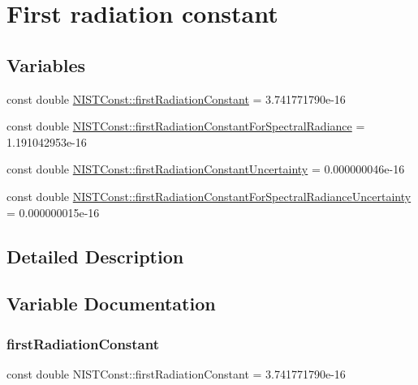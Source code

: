 \hypertarget{group___n_i_s_t_const-_first_radiation_constant}{}\section{First radiation constant}
\label{group___n_i_s_t_const-_first_radiation_constant}
\subsection*{Variables}
\begin{DoxyCompactItemize}
\item 
const double \hyperlink{group___n_i_s_t_const-_first_radiation_constant_ga59a54a84c539969a14695bd822b116cb}{N\+I\+S\+T\+Const\+::first\+Radiation\+Constant} = 3.\+741771790e-\/16
\item 
const double \hyperlink{group___n_i_s_t_const-_first_radiation_constant_ga877c0bc2579b88ae515b80aeb58aa68e}{N\+I\+S\+T\+Const\+::first\+Radiation\+Constant\+For\+Spectral\+Radiance} = 1.\+191042953e-\/16
\item 
const double \hyperlink{group___n_i_s_t_const-_first_radiation_constant_ga1b1ea4335364c4f0b19810842fd6c741}{N\+I\+S\+T\+Const\+::first\+Radiation\+Constant\+Uncertainty} = 0.\+000000046e-\/16
\item 
const double \hyperlink{group___n_i_s_t_const-_first_radiation_constant_gaa5c56cdaf9f43061450ff67b73dbba35}{N\+I\+S\+T\+Const\+::first\+Radiation\+Constant\+For\+Spectral\+Radiance\+Uncertainty} = 0.\+000000015e-\/16
\end{DoxyCompactItemize}


\subsection{Detailed Description}


\subsection{Variable Documentation}
\mbox{\label{group___n_i_s_t_const-_first_radiation_constant_ga59a54a84c539969a14695bd822b116cb}} 
\subsubsection{\texorpdfstring{first\+Radiation\+Constant}{firstRadiationConstant}}
{\footnotesize\ttfamily const double N\+I\+S\+T\+Const\+::first\+Radiation\+Constant = 3.\+741771790e-\/16}

